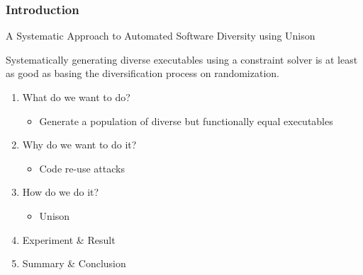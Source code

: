 \documentclass{beamer}
\begin{document}
\begin{frame}
	\frametitle{Introduction}

	A Systematic Approach to Automated Software Diversity using Unison

	\vspace{0.5cm}

	Systematically generating diverse executables using a constraint solver is at least as good as basing the diversification process on randomization.

	\begin{enumerate}
		\item What do we want to do?
			\begin{itemize}
				\item Generate a population of diverse but functionally equal executables
			\end{itemize}
		\item Why do we want to do it?
			\begin{itemize}
				\item Code re-use attacks
			\end{itemize}
		\item How do we do it?
			\begin{itemize}
				\item Unison
			\end{itemize}
		\item Experiment \& Result
		\item Summary \& Conclusion
	\end{enumerate}

\end{frame}










\end{document}
